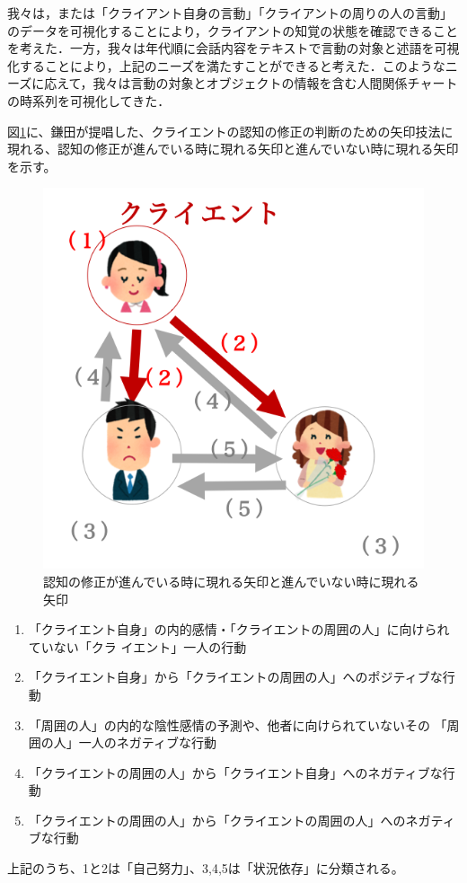 \documentclass[shuuron]{kuee}
\begin{document}
我々は，または「クライアント自身の言動」「クライアントの周りの人の言動」のデータを可視化することにより，クライアントの知覚の状態を確認できることを考えた．一方，我々は年代順に会話内容をテキストで言動の対象と述語を可視化することにより，上記のニーズを満たすことができると考えた．このようなニーズに応えて，我々は言動の対象とオブジェクトの情報を含む人間関係チャートの時系列を可視化してきた．

図\ref{fig:arrow}に、鎌田\cite{鎌田穣2002臨床}が提唱した、クライエントの認知の修正の判断のための矢印技法に現れる、認知の修正が進んでいる時に現れる矢印と進んでいない時に現れる矢印を示す。

\begin{figure}
  \begin{center}
    \includegraphics[width=\linewidth]{arrow.png}
  \end{center}
  \caption{認知の修正が進んでいる時に現れる矢印と進んでいない時に現れる矢印}
  \label{fig:arrow}
\end{figure}

\begin{enumerate}
  \item 「クライエント自身」の内的感情・「クライエントの周囲の人」に向けられていない「クラ
  イエント」一人の行動
  \item 「クライエント自身」から「クライエントの周囲の人」へのポジティブな行動


  \item 「周囲の人」の内的な陰性感情の予測や、他者に向けられていないその
  「周囲の人」一人のネガティブな行動
  \item 「クライエントの周囲の人」から「クライエント自身」へのネガティブな行動
  \item 「クライエントの周囲の人」から「クライエントの周囲の人」へのネガティブな行動

\end{enumerate}
上記のうち、1と2は「自己努力」、3,4,5は「状況依存」に分類される。
\end{document}

